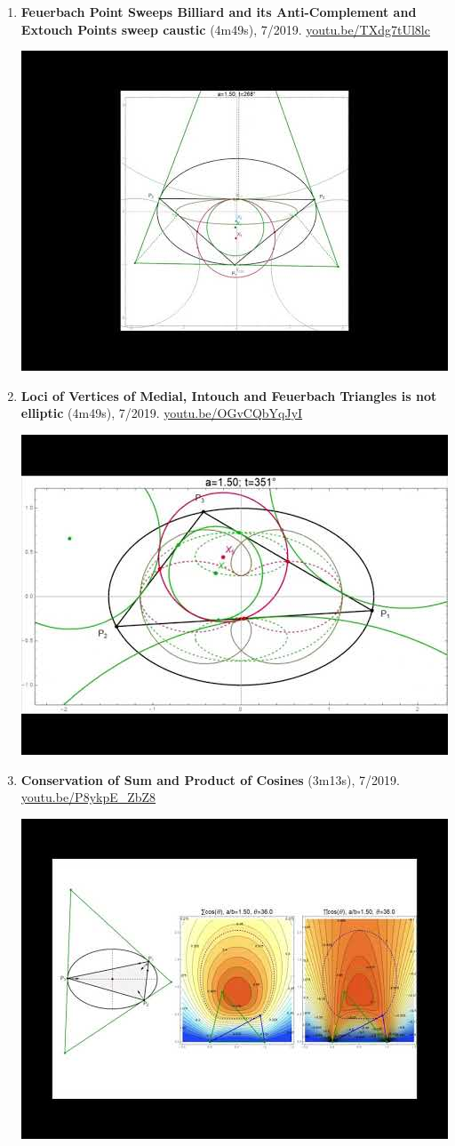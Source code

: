 \documentclass[12pt]{article}
\begin{document}
\begin{enumerate}[resume]
% 
\item \textbf{Feuerbach Point Sweeps Billiard and its Anti-Complement and Extouch Points sweep caustic} (4m49s), 7/2019. \href{https://youtu.be/TXdg7tUl8lc}{\url{youtu.be/TXdg7tUl8lc}}
\begin{center}\includegraphics[width=.5\textwidth]{pics/TXdg7tUl8lc.jpg}\end{center}
% 
\item \textbf{Loci of Vertices of Medial, Intouch and Feuerbach Triangles is not elliptic} (4m49s), 7/2019. \href{https://youtu.be/OGvCQbYqJyI}{\url{youtu.be/OGvCQbYqJyI}}
\begin{center}\includegraphics[width=.5\textwidth]{pics/OGvCQbYqJyI.jpg}\end{center}
% 
\item \textbf{Conservation of Sum and Product of Cosines} (3m13s), 7/2019. \href{https://youtu.be/P8ykpE_ZbZ8}{\url{youtu.be/P8ykpE\_ZbZ8}}
\begin{center}\includegraphics[width=.5\textwidth]{pics/P8ykpE_ZbZ8.jpg}\end{center}

\end{enumerate}
\end{document}
